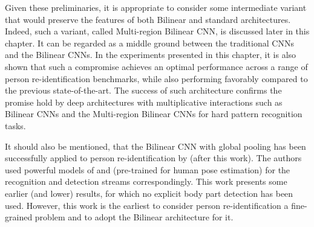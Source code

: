 Given these preliminaries, it is appropriate to consider some intermediate variant that would preserve the features of both Bilinear and standard architectures. Indeed, such a variant, called Multi-region Bilinear CNN, is discussed later in this chapter. It can be regarded as a middle ground between the traditional CNNs and the Bilinear CNNs. In the experiments presented in this chapter, it is also shown that such a compromise achieves an optimal performance across a range of person re-identification benchmarks, while also performing favorably compared to the  previous state-of-the-art. The success of such architecture confirms the promise hold by deep architectures with multiplicative interactions such as Bilinear CNNs and the Multi-region Bilinear CNNs for hard pattern recognition tasks.

It should also be mentioned, that the Bilinear CNN with global pooling has been successfully applied to person re-identification by \citep{suh2018part} (after this work). The authors used powerful models of \citep{szegedy2015going} and \citep{cao2017realtime} (pre-trained for human pose estimation) for the recognition and detection streams correspondingly. This work presents some earlier (and lower) results, for which no explicit body part detection has been used. However, this work is the earliest to consider person re-identification a fine-grained problem and to adopt the Bilinear architecture for it. %



